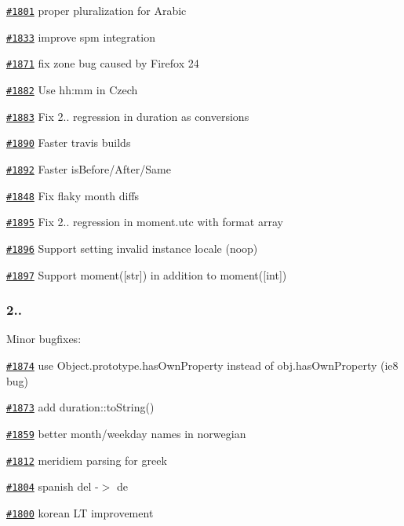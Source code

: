\begin{DoxyItemize}
\item \href{https://github.com/moment/moment/issues/1801}{\tt \#1801} proper pluralization for Arabic
\item \href{https://github.com/moment/moment/issues/1833}{\tt \#1833} improve spm integration
\item \href{https://github.com/moment/moment/issues/1871}{\tt \#1871} fix zone bug caused by Firefox 24
\item \href{https://github.com/moment/moment/issues/1882}{\tt \#1882} Use hh\+:mm in Czech
\item \href{https://github.com/moment/moment/issues/1883}{\tt \#1883} Fix 2.. regression in duration as conversions
\item \href{https://github.com/moment/moment/issues/1890}{\tt \#1890} Faster travis builds
\item \href{https://github.com/moment/moment/issues/1892}{\tt \#1892} Faster is\+Before/\+After/\+Same
\item \href{https://github.com/moment/moment/issues/1848}{\tt \#1848} Fix flaky month diffs
\item \href{https://github.com/moment/moment/issues/1895}{\tt \#1895} Fix 2.. regression in moment.\+utc with format array
\item \href{https://github.com/moment/moment/issues/1896}{\tt \#1896} Support setting invalid instance locale (noop)
\item \href{https://github.com/moment/moment/issues/1897}{\tt \#1897} Support moment(\mbox{[}str\mbox{]}) in addition to moment(\mbox{[}int\mbox{]})
\end{DoxyItemize}

\subsubsection*{2..}

Minor bugfixes\+:


\begin{DoxyItemize}
\item \href{https://github.com/moment/moment/issues/1874}{\tt \#1874} use {\ttfamily Object.\+prototype.\+has\+Own\+Property} instead of {\ttfamily obj.\+has\+Own\+Property} (ie8 bug)
\item \href{https://github.com/moment/moment/issues/1873}{\tt \#1873} add {\ttfamily duration\+::to\+String()}
\item \href{https://github.com/moment/moment/issues/1859}{\tt \#1859} better month/weekday names in norwegian
\item \href{https://github.com/moment/moment/issues/1812}{\tt \#1812} meridiem parsing for greek
\item \href{https://github.com/moment/moment/issues/1804}{\tt \#1804} spanish del -\/$>$ de
\item \href{https://github.com/moment/moment/issues/1800}{\tt \#1800} korean LT improvement
\end{DoxyItemize}


